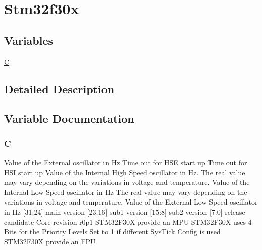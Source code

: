 \hypertarget{group__stm32f30x}{\section{Stm32f30x}
\label{group__stm32f30x}
}
\subsection*{Variables}
\begin{DoxyCompactItemize}
\item 
\hyperlink{group__stm32f30x_gaaa53ca0b650dfd85c4f59fa156f7a2cc}{C}
\end{DoxyCompactItemize}


\subsection{Detailed Description}


\subsection{Variable Documentation}
\hypertarget{group__stm32f30x_gaaa53ca0b650dfd85c4f59fa156f7a2cc}{
\subsubsection[{C}]{\setlength{\rightskip}{0pt plus 5cm}C}}\label{group__stm32f30x_gaaa53ca0b650dfd85c4f59fa156f7a2cc}
Value of the External oscillator in Hz Time out for H\-S\-E start up Time out for H\-S\-I start up Value of the Internal High Speed oscillator in Hz. The real value may vary depending on the variations in voltage and temperature. Value of the Internal Low Speed oscillator in Hz The real value may vary depending on the variations in voltage and temperature. Value of the External Low Speed oscillator in Hz \mbox{[}31\-:24\mbox{]} main version \mbox{[}23\-:16\mbox{]} sub1 version \mbox{[}15\-:8\mbox{]} sub2 version \mbox{[}7\-:0\mbox{]} release candidate Core revision r0p1 S\-T\-M32\-F30\-X provide an M\-P\-U S\-T\-M32\-F30\-X uses 4 Bits for the Priority Levels Set to 1 if different Sys\-Tick Config is used S\-T\-M32\-F30\-X provide an F\-P\-U 